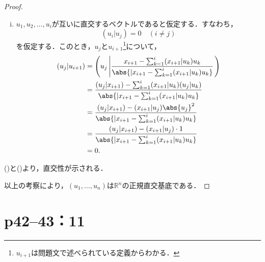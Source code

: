 \documentclass[a4paper,10pt,fleqn]{ltjsarticle}
\begin{document}
\begin{tleftbar}
\begin{proof}
\begin{description}
\begin{enumerate}[(i)]
                      \item $u_1, u_2, \ldots, u_i$が互いに直交するベクトルであると仮定する．すなわち，
                            \[
                                (u_i | u_j) = 0 \quad (i \ne j)
                            \]
                            を仮定する．このとき，$u_j$と$u_{i+1}$\footnote{$u_{i+1}$は問題文で述べられている定義からわかる．}について，
                            \begin{align*}
                                (u_j | u_{i+1}) & =\left  ( u_j \left| \frac{x_{i+1} - \sum_{k=1}^{i} (x_{i+1} | u_k) u_k}{\abs{| x_{i+1} - \sum_{k=1}^{i} (x_{i+1} | u_k) u_k }} \right. \right) \\
                                                & = \frac{(u_j | x_{i+1}) - \sum_{k=1}^{i} (x_{i+1} | u_k) (u_j | u_k)}{\abs{| x_{i+1} - \sum_{k=1}^{i} (x_{i+1} | u_k) u_k }}                    \\
                                                & = \frac{(u_j | x_{i+1}) - (x_{i+1} | u_j) \abs{u_j}^2}{\abs{| x_{i+1} - \sum_{k=1}^{i} (x_{i+1} | u_k) u_k }}                                   \\
                                                & = \frac{(u_j | x_{i+1}) - (x_{i+1} | u_j) \cdot 1}{\abs{| x_{i+1} - \sum_{k=1}^{i} (x_{i+1} | u_k) u_k }}                                       \\
                                                & = 0.
                            \end{align*}
                  \end{enumerate}
                  ()と()より，直交性が示される．
        \end{description}
        以上の考察により，$(u_1, \ldots, u_n)$は$\mathbb{R}^n$の正規直交基底である．
    \end{proof}
\end{tleftbar}

\newpage

\section*{p42--43：11}
\end{document}
